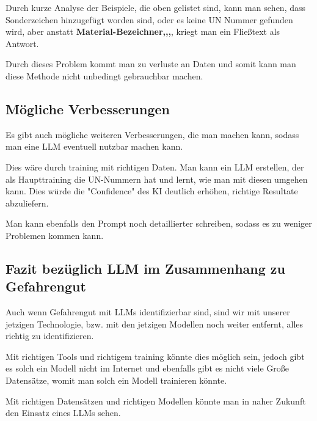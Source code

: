 Durch kurze Analyse der Beispiele, die oben gelistet sind, kann man sehen, dass
Sonderzeichen hinzugefügt worden sind, oder es keine UN Nummer gefunden wird,
aber anstatt \textbf{Material-Bezeichner,,,}, kriegt man ein Fließtext als Antwort.

Durch dieses Problem kommt man zu verluste an Daten und somit kann man diese Methode
nicht unbedingt gebrauchbar machen.

\subsection{Mögliche Verbesserungen}

Es gibt auch mögliche weiteren Verbesserungen, die man machen kann, sodass man eine
LLM eventuell nutzbar machen kann.

Dies wäre durch training mit richtigen Daten. Man kann ein LLM erstellen, der
als Haupttraining die UN-Nummern hat und lernt, wie man mit diesen umgehen kann.
Dies würde die "Confidence" des KI deutlich erhöhen, richtige Resultate abzuliefern.

Man kann ebenfalls den Prompt noch detaillierter schreiben, sodass es zu weniger
Problemen kommen kann.

\subsection{Fazit bezüglich LLM im Zusammenhang zu Gefahrengut}

Auch wenn Gefahrengut mit LLMs identifizierbar sind, sind wir mit unserer jetzigen Technologie,
bzw. mit den jetzigen Modellen noch weiter entfernt, alles richtig zu identifizieren.

Mit richtigen Tools und richtigem training könnte dies möglich sein, jedoch gibt es solch
ein Modell nicht im Internet und ebenfalls gibt es nicht viele Große Datensätze,
womit man solch ein Modell trainieren könnte.

Mit richtigen Datensätzen und richtigen Modellen könnte man in naher Zukunft den
Einsatz eines LLMs sehen.
